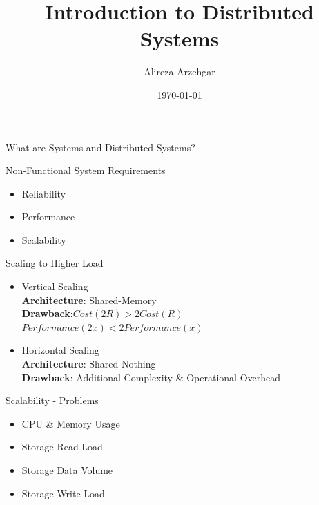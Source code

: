 \documentclass[xcolor={rgb}]{beamer}
\author{Alireza Arzehgar}
\title{Introduction to Distributed Systems}
\date{\today}
\newcommand{\pitem}{\pause\item}
\begin{document}
	\begin{frame}[plain]
		\titlepage
	\end{frame}

	\begin{frame}[plain,c]
		\begin{center}
		\Huge What are Systems and Distributed Systems?
		\end{center}
	\end{frame}

	\begin{frame}{Non-Functional System Requirements}
	\begin{itemize}
		\pitem Reliability
		\pitem Performance
		\pitem Scalability
	\end{itemize}
	\end{frame}

	\begin{frame}{Scaling to Higher Load}
		\begin{itemize}
			\pitem Vertical Scaling \\
				\pause \textbf{Architecture}: Shared-Memory \\
				\pause \textbf{Drawback}:$ Cost(2R) > 2Cost(R) $ \\
				$ Performance(2x) < 2Performance(x) $
			\pitem Horizontal Scaling \\
				\pause \textbf{Architecture}: Shared-Nothing \\
				\pause \textbf{Drawback}: Additional Complexity \& Operational Overhead
		\end{itemize}
	\end{frame}

	\begin{frame}{Scalability - Problems}
	\begin{itemize}
		\pitem CPU \& Memory Usage
		\pitem Storage Read Load
		\pitem Storage Data Volume
		\pitem Storage Write Load
	\end{itemize}
	\end{frame}
\end{document}
